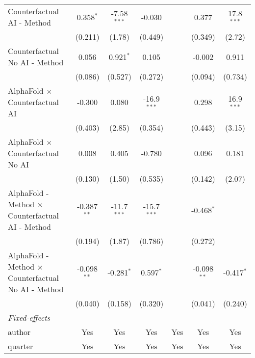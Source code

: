 \begin{tabular}{lcccccc}
   Counterfactual AI - Method                                 & 0.358$^{*}$   & -7.58$^{***}$ & -0.030        &       & 0.377          & 17.8$^{***}$\\   
                                                              & (0.211)       & (1.78)        & (0.449)       &       & (0.349)        & (2.72)\\   
   Counterfactual No AI - Method                              & 0.056         & 0.921$^{*}$   & 0.105         &       & -0.002         & 0.911\\   
                                                              & (0.086)       & (0.527)       & (0.272)       &       & (0.094)        & (0.734)\\   
   AlphaFold $\times$ Counterfactual AI                       & -0.300        & 0.080         & -16.9$^{***}$ &       & 0.298          & 16.9$^{***}$\\   
                                                              & (0.403)       & (2.85)        & (0.354)       &       & (0.443)        & (3.15)\\   
   AlphaFold $\times$ Counterfactual No AI                    & 0.008         & 0.405         & -0.780        &       & 0.096          & 0.181\\   
                                                              & (0.130)       & (1.50)        & (0.535)       &       & (0.142)        & (2.07)\\   
   AlphaFold - Method $\times$ Counterfactual AI - Method     & -0.387$^{**}$ & -11.7$^{***}$ & -15.7$^{***}$ &       & -0.468$^{*}$   &   \\   
                                                              & (0.194)       & (1.87)        & (0.786)       &       & (0.272)        &   \\   
   AlphaFold - Method $\times$ Counterfactual No AI - Method  & -0.098$^{**}$ & -0.281$^{*}$  & 0.597$^{*}$   &       & -0.098$^{**}$  & -0.417$^{*}$\\   
                                                              & (0.040)       & (0.158)       & (0.320)       &       & (0.041)        & (0.240)\\   
   \midrule
   \emph{Fixed-effects}\\
   author                                                     & Yes           & Yes           & Yes           & Yes   & Yes            & Yes\\  
   quarter                                                    & Yes           & Yes           & Yes           & Yes   & Yes            & Yes\\  

\end{tabular}
